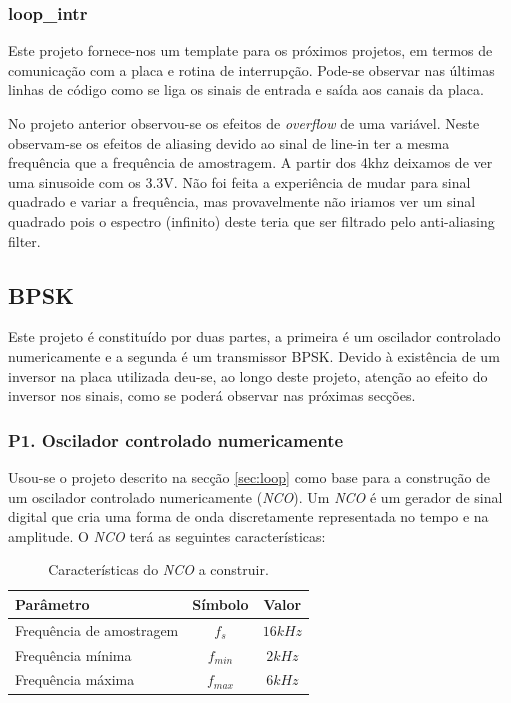 \documentclass[11pt]{article}
\begin{document}
\subsubsection{loop\_intr}
\label{sec:loop}
Este projeto fornece-nos um template para os próximos projetos, em termos de comunicação com a placa e rotina de interrupção. Pode-se observar nas últimas linhas de código como se liga os sinais de entrada e saída aos canais da placa.

No projeto anterior observou-se os efeitos de \textit{overflow} de uma variável. Neste observam-se os efeitos de aliasing  devido ao sinal de line-in ter a mesma frequência que a frequência de amostragem. A partir dos 4khz deixamos de ver uma sinusoide com os 3.3V. Não foi feita a experiência de mudar para sinal quadrado e variar a frequência, mas provavelmente não iriamos ver um sinal quadrado pois o espectro (infinito) deste teria que ser filtrado pelo anti-aliasing filter.

\subsection{BPSK}
Este projeto é constituído por duas partes, a primeira é um oscilador controlado numericamente e a segunda é um transmissor BPSK. Devido à existência de um inversor na placa utilizada deu-se, ao longo deste projeto, atenção ao efeito do inversor nos sinais, como se poderá observar nas próximas secções.

\subsubsection{P1. Oscilador controlado numericamente}

Usou-se o projeto descrito na secção \ref{sec:loop} como base para a construção de um oscilador controlado numericamente (\textit{NCO}). Um \textit{NCO} é um gerador de sinal digital que cria uma forma de onda discretamente representada no tempo e na amplitude. O \textit{NCO} terá as seguintes características:

\begin{table}[H]
	\centering
	\caption{Características do \textit{NCO} a construir.}
	\label{tab:NCO-car}
\begin{tabular}[c]{|l||c|c|}
	\hline \textbf{Parâmetro} & \textbf{Símbolo} & \textbf{Valor} \\ 
	\hline Frequência de amostragem & $ f_{s} $ & $ 16 kHz $ \\ 
	\hline Frequência mínima & $ f_{min} $ & $ 2 kHz $ \\ 
	\hline Frequência máxima & $ f_{max} $ & $ 6 kHz $ \\ 
	\hline
\end{tabular}
\end{table}
\end{document}
